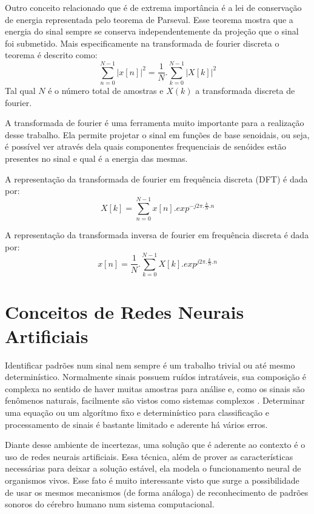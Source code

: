 Outro conceito relacionado que é de extrema importância é a lei de conservação de energia representada pelo teorema de Parseval. Esse teorema mostra que a energia do sinal sempre se conserva independentemente da projeção que o sinal foi submetido. Mais especificamente na transformada de fourier discreta o teorema é descrito como:
\begin{equation}
\label{eqn09}
	\sum_{n=0}^{N - 1}{|x[n]|^{2}} =  \frac{1}{N}.\sum_{k=0}^{N - 1}{|X[k]|^{2}}
\end{equation}
Tal qual $N$ é o número total de amostras e $X(k)$ a transformada discreta de fourier.

A transformada de fourier é uma ferramenta muito importante para a realização desse trabalho. Ela permite projetar o sinal em funções de base senoidais, ou seja, é possível ver através dela quais componentes frequenciais de senóides estão presentes no sinal e qual é a energia das mesmas.

A representação da transformada de fourier em frequência discreta (DFT) é dada por:
\begin{equation}
\label{eqn12}
	X[k] = \sum_{n=0}^{N - 1}{x[n].{exp}^{-j2\pi.\frac{k}{N}.n}}
\end{equation}

A representação da transformada inversa de fourier em frequência discreta é dada por:
\begin{equation}
\label{eqn13}
	x[n] = \frac{1}{N}.\sum_{k=0}^{N - 1}{X[k].{exp}^{j2\pi.\frac{k}{N}.n}}
\end{equation}


\section{Conceitos de Redes Neurais Artificiais}
\label{sec:conceitosredesneurais}

Identificar padrões num sinal nem sempre é um trabalho trivial ou até mesmo determinístico. Normalmente sinais possuem ruídos intratáveis, sua composição é complexa no sentido de haver muitas amostras para análise e, como os sinais são fenômenos naturais, facilmente são vistos como sistemas complexos \cite{morin}. Determinar uma equação ou um algorítmo fixo e determinístico para classificação e processamento de sinais é bastante limitado e aderente há vários erros.

Diante desse ambiente de incertezas, uma solução que é aderente ao contexto é o uso de redes neurais artificiais. Essa técnica, além de prover as características necessárias para deixar a solução estável, ela modela o funcionamento neural de organismos vivos. Esse fato é muito interessante visto que surge a possibilidade de usar os mesmos mecanismos (de forma análoga) de reconhecimento de padrões sonoros do cérebro humano num sistema computacional.


